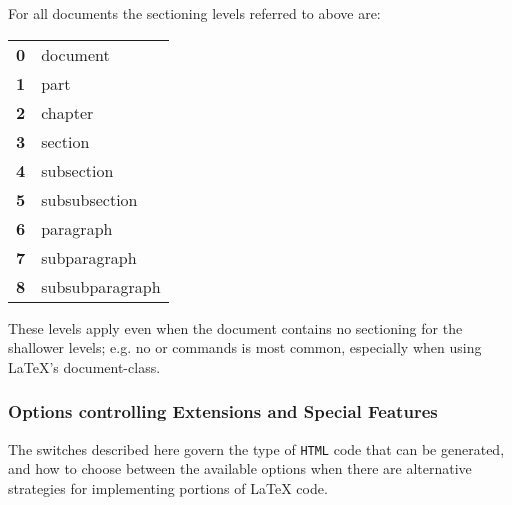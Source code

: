 \goodbreak
{}\label{seclevels}%
\html{\\}\noindent
For all documents the sectioning levels referred to above are:\nobreak
\begin{center}
\begin{tabular}{ll}
\textbf{0} & document\\
\textbf{1} & part\\
\textbf{2} & chapter\\
\textbf{3} & section\\
\textbf{4} & subsection\\
\textbf{5} & subsubsection\\
\textbf{6} & paragraph\\
\textbf{7} & subparagraph\\
\textbf{8} & subsubparagraph
\end{tabular}
\end{center}
These levels apply even when the document contains no sectioning for
the shallower levels; e.g. no  or  commands is most common,
especially when using \LaTeX's  document-class.



\subsubsection{Options controlling Extensions and Special Features}
%
%
\html{\\}\noindent
The switches described here govern the type of \texttt{HTML} code that
can be generated, and how to choose between the available options
when there are alternative strategies for implementing portions of \LaTeX{} code.

